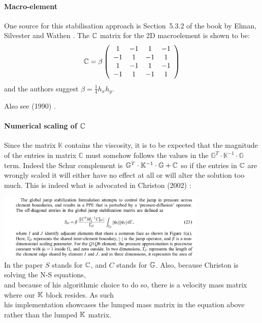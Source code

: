 \vspace{.5cm}

\paragraph{Macro-element}

One source for this stabilisation approach is Section~5.3.2 of the book by Elman, Silvester and Wathen \cite{elsw}.
The ${\mathbb{C}}$ matrix for the 2D macroelement is shown to be:
\[
{\mathbb{C}} = \beta
\left(
\begin{array}{cccc}
1 &-1& 1 &-1 \\
-1& 1& -1& 1 \\
1 &-1& 1 &-1 \\
-1& 1& -1& 1 
\end{array}
\right)
\]
and the authors suggest $\beta = \frac14 h_xh_y$.  



Also see \cite{fobo90} (1990) .

\vspace{.5cm}
\paragraph{Numerical scaling of ${\mathbb{C}}$}

Since the matrix $\mathbb{K}$ contains the viscosity, it is to be expected that the magnitude of the entries in matrix $\mathbb{C}$ must somehow follows the values in the $\mathbb{G}^T \cdot \mathbb{K}^{-1} \cdot \mathbb{G}$  term. Indeed the Schur complement is ${\mathbb{G}}^T\cdot{\mathbb{K}}^{-1}\cdot{\mathbb{G}}+{\mathbb{C}}$ so if the entries in ${\mathbb{C}}$ are wrongly scaled it will either have no effect at all or will alter the solution too much.
This is indeed what is advocated in Christon (2002) \cite{chri02}:

\begin{center}
\includegraphics[width=10cm]{images/q1p0stab/chri02a}\\
{\captionfont In the paper $S$ stands for ${\mathbb{C}}$, and $C$ stands for ${\mathbb{G}}$. Also, because Christon is solving the N-S equations,\\ and because of his algorithmic choice to do so, there is a velocity mass matrix where our ${\mathbb{K}}$ block resides. As such\\ his implementation showcases the lumped mass matrix in the equation above rather than the lumped ${\mathbb{K}}$ matrix.\\} 
\end{center}

